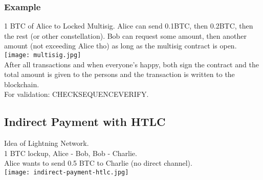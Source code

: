 \subsubsection{Example}
1 BTC of Alice to Locked Multisig.
Alice can send 0.1BTC, then 0.2BTC, then the rest (or other constellation).
Bob can request some amount, then another amount (not exceeding Alice tho) as long as the multisig contract is open.\\
\texttt{[image: multisig.jpg]}\\
After all transactions and when everyone's happy, both sign the contract and the total amount is given to the persons and the transaction is written to the blockchain.\\
For validation: CHECKSEQUENCEVERIFY. 

\subsection{Indirect Payment with HTLC}
Idea of Lightning Network.\\
1 BTC lockup, Alice - Bob, Bob - Charlie.\\
Alice wants to send 0.5 BTC to Charlie (no direct channel).\\
\texttt{[image: indirect-payment-htlc.jpg]}
